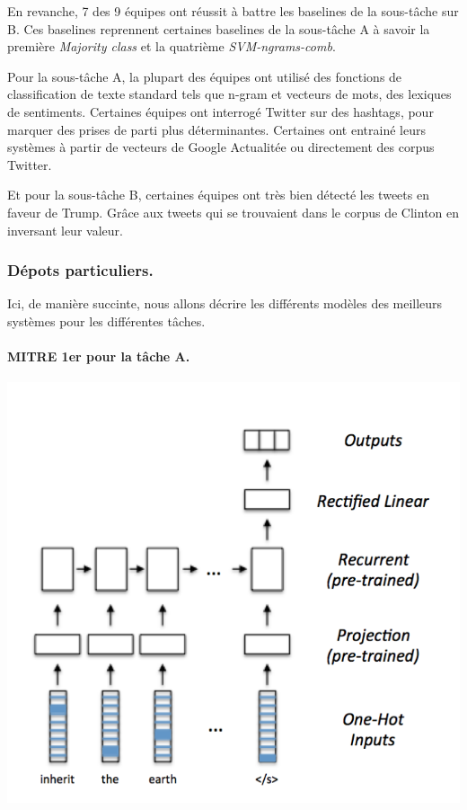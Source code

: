 \documentclass[onecolumn, 12pt]{article}
\begin{document}
En revanche, 7 des 9 équipes ont réussit à battre les baselines de la sous-tâche sur B.
Ces baselines reprennent certaines baselines de la sous-tâche A à savoir la première  \textit{Majority class} et la quatrième \textit{SVM-ngrams-comb}.

Pour la sous-tâche A, la plupart des équipes ont utilisé des fonctions de classification de texte standard tels que n-gram et vecteurs de mots, des lexiques de sentiments.
Certaines équipes ont interrogé Twitter sur des hashtags, pour marquer des prises de parti plus déterminantes.
Certaines ont entrainé leurs systèmes à partir de  vecteurs de Google Actualitée ou directement des corpus Twitter.

Et pour la sous-tâche B, certaines équipes ont très bien détecté les tweets en faveur
de Trump. Grâce aux tweets qui se trouvaient dans le corpus de Clinton en inversant leur valeur.

\subsubsection{Dépots particuliers.}
Ici, de manière succinte, nous allons décrire les différents modèles des meilleurs systèmes pour les différentes tâches.

\paragraph{MITRE 1er pour la tâche A.}

\begin{center}
 \includegraphics[scale=0.25]{../../img/model/mitre/model.png}
 \label{mitre_model}
\end{center}
\end{document}
